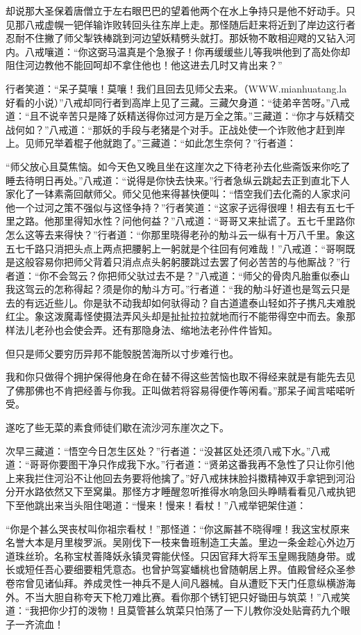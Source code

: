 \documentclass[12pt,UTF8]{ctexbook}
\begin{document}
却说那大圣保着唐僧立于左右眼巴巴的望着他两个在水上争持只是他不好动手。只见那八戒虚幌一钯佯输诈败转回头往东岸上走。那怪随后赶来将近到了岸边这行者忍耐不住撇了师父掣铁棒跳到河边望妖精劈头就打。那妖物不敢相迎飕的又钻入河内。八戒嚷道：“你这弼马温真是个急猴子！你再缓缓些儿等我哄他到了高处你却阻住河边教他不能回呵却不拿住他也！他这进去几时又肯出来？”

行者笑道：“呆子莫嚷！莫嚷！我们且回去见师父去来。（WWW.mianhuatang.la 好看的小说）”八戒却同行者到高岸上见了三藏。三藏欠身道：“徒弟辛苦呀。”八戒道：“且不说辛苦只是降了妖精送得你过河方是万全之策。”三藏道：“你才与妖精交战何如？”八戒道：“那妖的手段与老猪是个对手。正战处使一个诈败他才赶到岸上。见师兄举着棍子他就跑了。”三藏道：“如此怎生奈何？”行者道：

“师父放心且莫焦恼。如今天色又晚且坐在这崖次之下待老孙去化些斋饭来你吃了睡去待明日再处。”八戒道：“说得是你快去快来。”行者急纵云跳起去正到直北下人家化了一钵素斋回献师父。师父见他来得甚快便叫：“悟空我们去化斋的人家求问他一个过河之策不强似与这怪争持？”行者笑道：“这家子远得很哩！相去有五七千里之路。他那里得知水性？问他何益？”八戒道：“哥哥又来扯谎了。五七千里路你怎么这等去来得快？”行者道：“你那里晓得老孙的觔斗云一纵有十万八千里。象这五七千路只消把头点上两点把腰躬上一躬就是个往回有何难哉！”八戒道：“哥啊既是这般容易你把师父背着只消点点头躬躬腰跳过去罢了何必苦苦的与他厮战？”行者道：“你不会驾云？你把师父驮过去不是？”八戒道：“师父的骨肉凡胎重似泰山我这驾云的怎称得起？须是你的觔斗方可。”行者道：“我的觔斗好道也是驾云只是去的有远近些儿。你是驮不动我却如何驮得动？自古道遣泰山轻如芥子携凡夫难脱红尘。象这泼魔毒怪使摄法弄风头却是扯扯拉拉就地而行不能带得空中而去。象那样法儿老孙也会使会弄。还有那隐身法、缩地法老孙件件皆知。

但只是师父要穷历异邦不能彀脱苦海所以寸步难行也。

我和你只做得个拥护保得他身在命在替不得这些苦恼也取不得经来就是有能先去见了佛那佛也不肯把经善与你我。正叫做若将容易得便作等闲看。”那呆子闻言喏喏听受。

遂吃了些无菜的素食师徒们歇在流沙河东崖次之下。

次早三藏道：“悟空今日怎生区处？”行者道：“没甚区处还须八戒下水。”八戒道：“哥哥你要图干净只作成我下水。”行者道：“贤弟这番我再不急性了只让你引他上来我拦住河沿不让他回去务要将他擒了。”好八戒抹抹脸抖擞精神双手拿钯到河沿分开水路依然又下至窝巢。那怪方才睡醒忽听推得水响急回头睁睛看看见八戒执钯下至他跳出来当头阻住喝道：“慢来！慢来！看杖！”八戒举钯架住道：

“你是个甚么哭丧杖叫你祖宗看杖！”那怪道：“你这厮甚不晓得哩！我这宝杖原来名誉大本是月里梭罗派。吴刚伐下一枝来鲁班制造工夫盖。里边一条金趁心外边万道珠丝玠。名称宝杖善降妖永镇灵霄能伏怪。只因官拜大将军玉皇赐我随身带。或长或短任吾心要细要粗凭意态。也曾护驾宴蟠桃也曾随朝居上界。值殿曾经众圣参卷帘曾见诸仙拜。养成灵性一神兵不是人间凡器械。自从遭贬下天门任意纵横游海外。不当大胆自称夸天下枪刀难比赛。看你那个锈钉钯只好锄田与筑菜！”八戒笑道：“我把你少打的泼物！且莫管甚么筑菜只怕荡了一下儿教你没处贴膏药九个眼子一齐流血！
\end{document}
